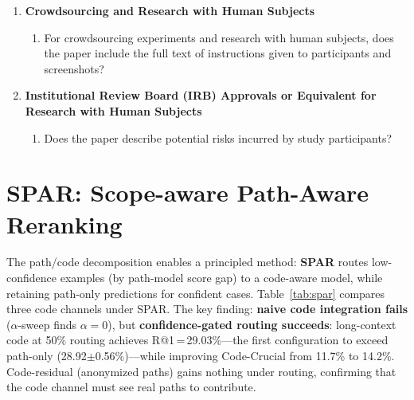 \documentclass{article}
\begin{document}
\begin{enumerate}
\item {\bf Crowdsourcing and Research with Human Subjects}
    \begin{enumerate}
        \item For crowdsourcing experiments and research with human subjects, does the paper include the full text of instructions given to participants and screenshots?
    \end{enumerate}

\item {\bf Institutional Review Board (IRB) Approvals or Equivalent for Research with Human Subjects}
    \begin{enumerate}
        \item Does the paper describe potential risks incurred by study participants?
    \end{enumerate}

\end{enumerate}


\appendix

\section{SPAR: Scope-aware Path-Aware Reranking}
\label{app:spar}

The path/code decomposition enables a principled method: \textbf{SPAR} routes low-confidence examples (by path-model score gap) to a code-aware model, while retaining path-only predictions for confident cases.
Table~\ref{tab:spar} compares three code channels under SPAR.
The key finding: \textbf{naive code integration fails} ($\alpha$-sweep finds $\alpha{=}0$), but \textbf{confidence-gated routing succeeds}: long-context code at 50\% routing achieves R@1\,=\,29.03\%---the first configuration to exceed path-only (28.92$\pm$0.56\%)---while improving Code-Crucial from 11.7\% to 14.2\%.
Code-residual (anonymized paths) gains nothing under routing, confirming that the code channel must see real paths to contribute.
\end{document}
